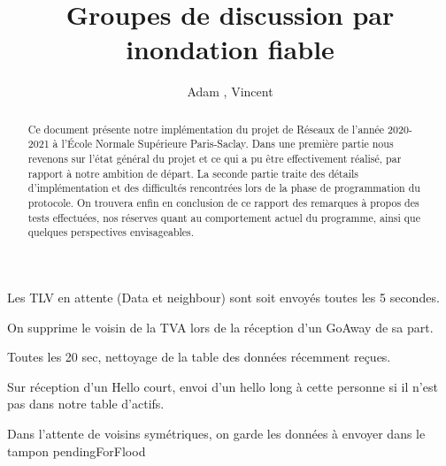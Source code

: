 \documentclass[12pt,a4paper]{article}
\title{Groupes de discussion par inondation fiable}
\author{Adam \bsc{Phillips}, Vincent \bsc{Bonczak}}
\begin{document}
  \maketitle
	
	\begin{abstract}
	Ce document présente notre implémentation du projet de Réseaux de l'année 2020-2021 à l'École Normale Supérieure Paris-Saclay. Dans une première partie
	nous revenons sur l'état général du projet et ce qui a pu être effectivement réalisé, par rapport à notre ambition de départ. La seconde partie traite 
	des détails d'implémentation et des difficultés rencontrées lors de la phase de programmation du protocole. On trouvera enfin en conclusion de ce rapport
	des remarques à propos des tests effectuées, nos réserves quant au comportement actuel du programme, ainsi que quelques perspectives envisageables.
	\end{abstract}
	
	
\section{}
	
	Les TLV en attente (Data et neighbour) sont soit envoyés toutes les 5 secondes.
	
	On supprime le voisin de la TVA lors de la réception d'un GoAway de sa part.
	
	Toutes les 20 sec, nettoyage de la table des données récemment reçues.
	
	Sur réception d'un Hello court, envoi d'un hello long à cette personne si il n'est pas dans notre table d'actifs.
	
	Dans l'attente de voisins symétriques, on garde les données à envoyer dans le tampon pendingForFlood
	
\end{document}

